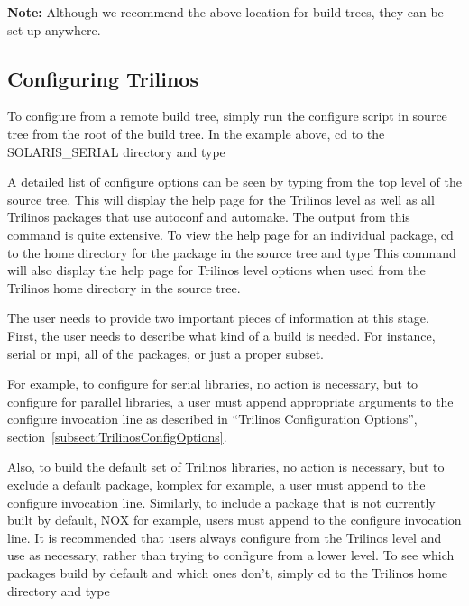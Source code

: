 \documentclass[12pt,strict]{TrilinosDevGuide}
\begin{document}
{\bf Note:} Although we recommend the above location for build trees,
they can be set up anywhere.

\subsection{Configuring Trilinos}
\label{Subsection:ConfiguringTrilinos}
	To configure from a remote build tree, simply run the configure script 
in source tree from the root of the build tree.  In the example above, cd to 
the SOLARIS\_SERIAL directory and type 

A detailed list of configure options can be seen by typing
 from the top level of the 
source tree.  This will display the help page for the Trilinos level as well as all 
Trilinos packages that use autoconf and automake.  The output from this command
is quite extensive.  To view the help page for an individual package, cd to 
the home directory for the package in the source tree and type 
This command will also display the help page for Trilinos level 
options when used from the Trilinos home directory in the source tree.


	The user needs to provide two important pieces of information at this 
stage.  First, the user needs to describe what kind of a build is needed.  For 
instance, serial or mpi, all of the packages, or just a proper subset.  

	For example, to configure for serial libraries, no action is necessary,
but to configure for parallel libraries, a user must append appropriate 
arguments to the configure invocation line as described in ``Trilinos 
Configuration Options'', section~\ref{subsect:TrilinosConfigOptions}.

	Also, to build the default set of Trilinos libraries, no action is 
necessary, but to exclude a default package, komplex for example, a user must 
append  to the configure invocation  line.  
Similarly, to include a package that is not currently built by default, NOX 
for example, users must append  to the configure 
invocation line.  It is recommended that users always configure from the 
Trilinos level and use  as necessary, 
rather than trying to configure from a lower level.  To see which packages 
build by default and which ones don't, simply cd to the Trilinos home 
directory and type 
\end{document}
